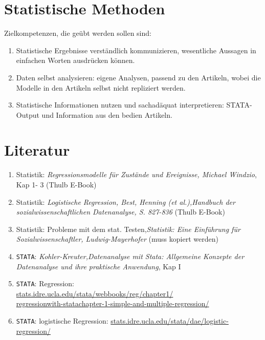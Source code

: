 \documentclass[a4paper,fontsize=14pt]{article}
\begin{document}
\section{Statistische Methoden}
Zielkompetenzen, die geübt werden sollen sind:
\begin{enumerate}
\item{Statistische Ergebnisse verständlich kommunizieren, wesentliche Aussagen in einfachen Worten ausdrücken können.}
\item{Daten selbst analysieren: eigene Analysen, passend zu den Artikeln, wobei die Modelle in den Artikeln selbst nicht repliziert werden.}
\item{Statistische Informationen nutzen und sachadäquat interpretieren: STATA-Output und Information aus den bedien Artikeln.}
\end{enumerate}

\section{Literatur}

\begin{enumerate}
\item{Statistik:  \textit{Regressionsmodelle für Zustände und Ereignisse, Michael Windzio},  Kap 1- 3 (Thulb E-Book)}
\item{Statistik: \textit{Logistische Regression, Best, Henning (et al.),Handbuch der sozialwissenschaftlichen Datenanalyse, S. 827-836} (Thulb E-Book)}
\item{Statistik: Probleme mit dem stat. Testen,\textit{Statistik: Eine Einführung für Sozialwissenschaftler,
Ludwig-Mayerhofer  } (muss kopiert werden)}
\item{\texttt{STATA}: \textit{Kohler-Kreuter,Datenanalyse mit Stata: Allgemeine Konzepte der Datenanalyse und ihre praktische Anwendung}, Kap I}
\item{\texttt{STATA}: Regression:\\  \url{stats.idre.ucla.edu/stata/webbooks/reg/chapter1/}\\ \url{regressionwith-statachapter-1-simple-and-multiple-regression/}}
\item{\texttt{STATA}: logistische Regression: \url{stats.idre.ucla.edu/stata/dae/logistic-regression/}}
\end{enumerate}

\end{document}
